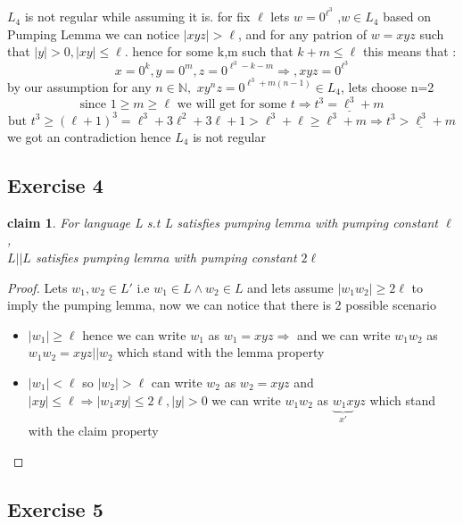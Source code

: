 \documentclass[12pt]{article}
\newtheorem{claim}[theorem]{claim}
\newcommand{\N}{\mathbb{N}}
\begin{document}
  $L_4$ is not regular while assuming it is. for fix $\ell$ lets $w=0^{\ell^3} $ ,$w\in L_4$ based on Pumping Lemma we can notice $|xyz|>\ell$, and for any patrion of $w=xyz$ such that $|y|>0,|xy|\leq \ell$. hence for some k,m such that $k+m\leq \ell$ this means that :
  \[x=0^k,y=0^m,z=0^{\ell^3-k-m}\Rightarrow,xyz=0^{\ell^3}
  \] 
by  our assumption for any $n\in \N,$ $ xy^nz=0^{\ell^3+m(n-1)}\in L_4$, lets choose n=2  \[\text{since $1\geq m \geq \ell$ we will get for some $t$}
\Rightarrow \underline{t^3=\ell^3+m }
\]
\[\text{but } t^3\geq(\ell+1)^3=\ell^3+3\ell^2+3\ell+1>
\ell^3+\ell\geq\ell^3+m\Rightarrow \underline{t^3>\ell^3+m}
\]
we got an contradiction hence $L_4$ is not regular
\subsection{Exercise 4}
\begin{claim}
For language L s.t L satisfies pumping lemma with pumping constant $\ell$
, \\$L||L$ satisfies pumping lemma with pumping constant  $2\ell$
\end{claim}
\begin{proof} Lets $w_1,w_2\in L'$ i.e $w_1\in L \wedge w_2 \in L $ and lets assume $|w_1w_2|\geq 2\ell$ to imply the pumping lemma, now we can notice that there is 2 possible scenario  
\begin{itemize}
  \item $|w_1|\geq \ell$ hence we can write $w_1$ as $w_1=xyz  \Rightarrow$ and we can write $w_1w_2$ as $w_1w_2=xyz||w_2$ which stand with the lemma property  
  \item $|w_1|<\ell$ so $|w_2|>\ell$ can write $w_2$ as $w_2=xyz$ and $|xy|\leq\ell\Rightarrow |w_1xy|\leq 2\ell,|y|>0$  we can write $w_1w_2$ as $\underbrace{w_1x}_{x'}yz$ which stand with the claim property   
\end{itemize}
\end{proof}
\subsection{Exercise 5}
\end{document}
